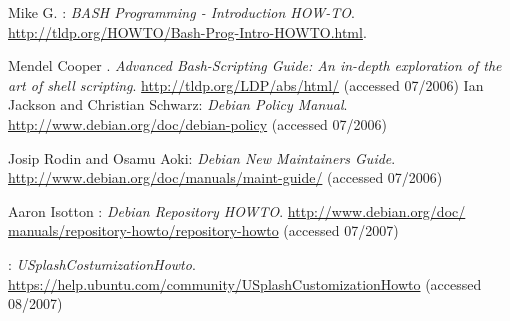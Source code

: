 
\bigskip{\par}
\backmatter
{}
\begin{thebibliography}{99}
 Mike G. : \newblock \emph{BASH %
	Programming - Introduction HOW-TO}. \href{http://tldp.org/HOWTO/Bash-Prog%
	-Intro-HOWTO.html}{http://tldp.org/HOWTO/Bash-Prog-Intro-HOWTO.html}.

 Mendel Cooper . \newblock
	\emph{Advanced Bash-Scripting Guide: An in-depth exploration of the %
	art of shell scripting}. \href{http://tldp.org/LDP/abs/html/}%
	{http://tldp.org/LDP/abs/html/} (accessed 07/2006)
 Ian Jackson and Christian Schwarz: \newblock
	\emph{Debian Policy Manual}.
	\href{http://www.debian.org/doc/debian-policy}%
	{http://www.debian.org/doc/debian-policy} (accessed 07/2006)

 Josip Rodin and Osamu Aoki: \newblock
	\emph{Debian New Maintainers Guide}.
	\href{http://www.debian.org/doc/manuals/maint-guide/}%
	{http://www.debian.org/doc/manuals/maint-guide/} (accessed 07/2006)

 Aaron Isotton :
	\newblock \emph{Debian Repository HOWTO}. \href{http://www.debian.org/doc/%
	manuals/repository-howto/repository-howto}{http://www.debian.org/doc/%
	manuals/repository-howto/repository-howto} (accessed 07/2007)

 :
	\emph{USplashCostumizationHowto}.
	\href{https://help.ubuntu.com/community/USplashCustomizationHowto}
		{https://help.ubuntu.com/community/USplashCustomizationHowto}
	(accessed 08/2007)


\end{thebibliography}
\todos
